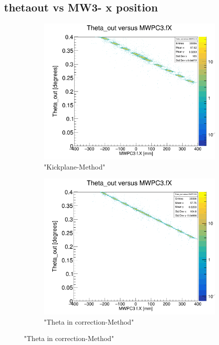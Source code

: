 \documentclass[12pt, letterpaper]{article}
\begin{document}
\subsection{theta\textunderscore out vs MW3- x position }
\begin{figure}[!htbp]
\begin{subfigure}{.5\textwidth}
  \centering
  \includegraphics[width=.9\linewidth]{plot_imgs/theta_out_mw3_get_centr.png}  
  \caption{"Kickplane-Method"}
  \label{fig:sub-first}
\end{subfigure}
\begin{subfigure}{.5\textwidth}
  \centering
  \includegraphics[width=.9\linewidth]{plot_imgs/theta_out_mw3_corr.png} 
  \caption{"Theta \textunderscore in correction-Method"}

\end{subfigure}
\end{figure}
\end{document}
